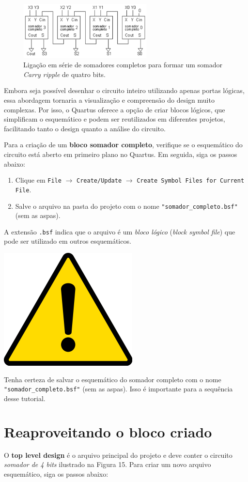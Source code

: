 \documentclass[12pt,a4paper]{article}
\newcommand{\Attention}[1]{
    \begin{tcolorbox}[colback=red!5!white, colframe=red!75!black]
        \noindent
        \begin{minipage}[c]{1cm}%
            \includegraphics[width=\linewidth]{figs/attention.png}
        \end{minipage}%
        \hfill%
        \begin{minipage}[c]{\dimexpr\linewidth-1cm-2mm}%
            \begin{center}
                #1    
            \end{center}            
        \end{minipage}
    \end{tcolorbox}
}
\begin{document}
\begin{figure}[htbp!]
    \centering
    \includegraphics[width=0.6\textwidth]{./figs/somadorCompleto.png}
    \caption{Ligação em série de somadores completos para formar um somador \textit{Carry ripple} de quatro bits.}
    \label{fig:somadorCompletoLigado}
\end{figure}

Embora seja possível desenhar o circuito inteiro utilizando apenas portas lógicas, essa abordagem tornaria a visualização e compreensão do design muito complexas. Por isso, o Quartus oferece a opção de criar blocos lógicos, que simplificam o esquemático e podem ser reutilizados em diferentes projetos, facilitando tanto o design quanto a análise do circuito.

Para a criação de um \textbf{bloco somador completo}, verifique se o esquemático do circuito está aberto em primeiro plano no Quartus. Em seguida, siga os passos abaixo:

\begin{enumerate}
    \item Clique em \texttt{File} $\rightarrow$ \texttt{Create/Update} $\rightarrow$ \texttt{Create Symbol Files for Current File}.
    \item Salve o arquivo na pasta do projeto com o nome \texttt{"somador\_completo.bsf"} (sem as aspas). 
\end{enumerate}

A extensão \texttt{.bsf} indica que o arquivo é um \textit{bloco lógico} (\textit{block symbol file}) que pode ser utilizado em outros esquemáticos.

\Attention{Tenha certeza de salvar o esquemático do somador completo com o nome \texttt{"somador\_completo.bsf"} (sem as aspas). Isso é importante para a sequência desse tutorial.}

\section{Reaproveitando o bloco criado}

O \textbf{top level design} é o arquivo principal do projeto e deve conter o circuito \textit{somador de 4 bits} ilustrado na Figura 15. Para criar um novo arquivo esquemático, siga os passos abaixo:
\end{document}
